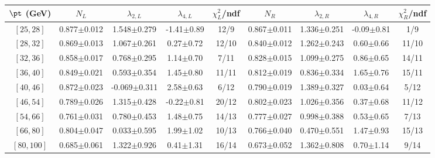 \begin{tabular}{c||c|c|c|c||c|c|c|c}
$\pt$ (GeV) & $N_L$ & $\lambda_{2,L}$ & $\lambda_{4,L}$  & $\chi^2_L$/ndf & $N_R$ & $\lambda_{2,R}$ & $\lambda_{4,R}$  & $\chi^2_R$/ndf \\
\hline
$[25, 28]$ & 0.877$\pm$0.012 & 1.548$\pm$0.279 & -1.41$\pm$0.89 & 12/9 & 0.867$\pm$0.011 & 1.336$\pm$0.251 & -0.09$\pm$0.81 & 1/9\\
$[28, 32]$ & 0.869$\pm$0.013 & 1.067$\pm$0.261 & 0.27$\pm$0.72 & 12/10 & 0.840$\pm$0.012 & 1.262$\pm$0.243 & 0.60$\pm$0.66 & 11/10\\
$[32, 36]$ & 0.858$\pm$0.017 & 0.768$\pm$0.295 & 1.14$\pm$0.70 & 7/11 & 0.828$\pm$0.015 & 1.099$\pm$0.275 & 0.86$\pm$0.65 & 14/11\\
$[36, 40]$ & 0.849$\pm$0.021 & 0.593$\pm$0.354 & 1.45$\pm$0.80 & 11/11 & 0.812$\pm$0.019 & 0.836$\pm$0.334 & 1.65$\pm$0.76 & 15/11\\
$[40, 46]$ & 0.872$\pm$0.023 & -0.069$\pm$0.311 & 2.58$\pm$0.63 & 6/12 & 0.790$\pm$0.019 & 1.389$\pm$0.327 & 0.03$\pm$0.64 & 5/12\\
$[46, 54]$ & 0.789$\pm$0.026 & 1.315$\pm$0.428 & -0.22$\pm$0.81 & 20/12 & 0.802$\pm$0.023 & 1.026$\pm$0.356 & 0.37$\pm$0.68 & 11/12\\
$[54, 66]$ & 0.761$\pm$0.031 & 0.780$\pm$0.453 & 1.48$\pm$0.75 & 14/13 & 0.777$\pm$0.027 & 0.998$\pm$0.388 & 0.53$\pm$0.65 & 7/13\\
$[66, 80]$ & 0.804$\pm$0.047 & 0.033$\pm$0.595 & 1.99$\pm$1.02 & 10/13 & 0.766$\pm$0.040 & 0.470$\pm$0.551 & 1.47$\pm$0.93 & 15/13\\
$[80, 100]$ & 0.685$\pm$0.061 & 1.322$\pm$0.926 & 0.41$\pm$1.31 & 16/14 & 0.673$\pm$0.052 & 1.362$\pm$0.808 & 0.70$\pm$1.14 & 9/14\\
\end{tabular}

